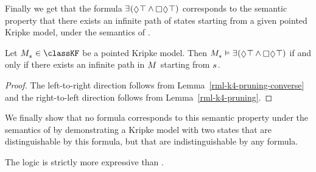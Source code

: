 Finally we get that the formula $\somerefs (\possible \top \land \necessary \possible \top)$ corresponds to the semantic property that there exists an infinite path of states starting from a given pointed Kripke model, under the semantics of \logicRmlKF{}.

\begin{lemma}\label{refinements-infinite-paths-formula}
Let $\kPModel{\kStateS} \in \classKF$ be a pointed Kripke model.
Then $\kPModel{\kStateS} \entails \somerefs(\possible \top \land \necessary \possible \top)$ if and only if there exists an infinite path in $\kModel$ starting from $\kStateS$.
\end{lemma}

\begin{proof}
The left-to-right direction follows from Lemma~\ref{rml-k4-pruning-converse} and the right-to-left direction follows from Lemma~\ref{rml-k4-pruning}.
\end{proof}

We finally show that no \langMl{} formula corresponds to this semantic property under the semantics of \logicKF{} by demonstrating a \classKF{} Kripke model with two states that are distinguishable by this \langRml{} formula, but that are indistinguishable by any \langMl{} formula.

\begin{theorem}
The logic \logicRmlKF{} is strictly more expressive than \logicKF{}.
\end{theorem}

